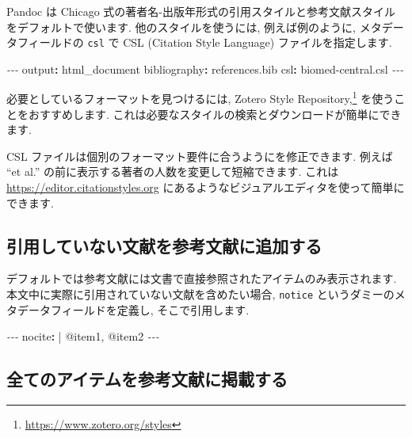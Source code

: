\documentclass[
  11pt,
  lualatex,ja=standard,jafont=noto]{bxjsreport}
\newenvironment{Shaded}{\begin{snugshade}}{\end{snugshade}}
\newcommand{\AttributeTok}[1]{\textcolor[rgb]{0.77,0.63,0.00}{#1}}
\newcommand{\CharTok}[1]{\textcolor[rgb]{0.31,0.60,0.02}{#1}}
\newcommand{\FunctionTok}[1]{\textcolor[rgb]{0.00,0.00,0.00}{#1}}
\newcommand{\KeywordTok}[1]{\textcolor[rgb]{0.13,0.29,0.53}{\textbf{#1}}}
\newcommand{\NormalTok}[1]{#1}
\newcommand{\PreprocessorTok}[1]{\textcolor[rgb]{0.56,0.35,0.01}{\textit{#1}}}
\renewcommand{\href}[2]{#2\footnote{\url{#1}}}
\begin{document}
Pandoc は Chicago 式の著者名-出版年形式の引用スタイルと参考文献スタイルをデフォルトで使います. 他のスタイルを使うには, 例えば例のように, メタデータフィールドの \texttt{csl} で CSL (Citation Style Language) ファイルを指定します.

\begin{Shaded}
\begin{Highlighting}[]
\PreprocessorTok{{-}{-}{-}}
\FunctionTok{output}\KeywordTok{:}\AttributeTok{ html\_document}
\FunctionTok{bibliography}\KeywordTok{:}\AttributeTok{ references.bib}
\FunctionTok{csl}\KeywordTok{:}\AttributeTok{ biomed{-}central.csl}
\PreprocessorTok{{-}{-}{-}}
\end{Highlighting}
\end{Shaded}

必要としているフォーマットを見つけるには, \href{https://www.zotero.org/styles}{Zotero Style Repository,} を使うことをおすすめします. これは必要なスタイルの検索とダウンロードが簡単にできます.

CSL ファイルは個別のフォーマット要件に合うようにを修正できます. 例えば ``et al.'' の前に表示する著者の人数を変更して短縮できます. これは \url{https://editor.citationstyles.org} にあるようなビジュアルエディタを使って簡単にできます.

\hypertarget{add-an-item-to-a-bibliography-without-using-it}{%
\subsection{引用していない文献を参考文献に追加する}\label{add-an-item-to-a-bibliography-without-using-it}}

デフォルトでは参考文献には文書で直接参照されたアイテムのみ表示されます. 本文中に実際に引用されていない文献を含めたい場合, \texttt{notice} というダミーのメタデータフィールドを定義し, そこで引用します.

\begin{Shaded}
\begin{Highlighting}[]
\PreprocessorTok{{-}{-}{-}}
\FunctionTok{nocite}\KeywordTok{: }\CharTok{|}
\NormalTok{  @item1, @item2}
\PreprocessorTok{{-}{-}{-}}
\end{Highlighting}
\end{Shaded}

\hypertarget{add-all-items-to-the-bibliography}{%
\subsection{全てのアイテムを参考文献に掲載する}\label{add-all-items-to-the-bibliography}}
\end{document}
